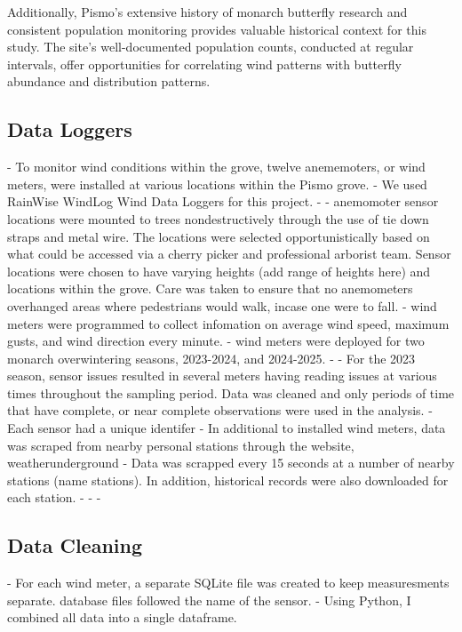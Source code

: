 Additionally, Pismo's extensive history of monarch butterfly research and consistent population monitoring provides valuable historical context for this study. The site's well-documented population counts, conducted at regular intervals, offer opportunities for correlating wind patterns with butterfly abundance and distribution patterns.

\subsection{Data Loggers}

- To monitor wind conditions within the grove, twelve anememoters, or wind meters, were installed at various locations within the Pismo grove.
- We used RainWise WindLog Wind Data Loggers for this project. 
- %
- anemomoter sensor locations were mounted to trees nondestructively through the use of tie down straps and metal wire. The locations were selected opportunistically based on what could be accessed via a cherry picker and professional arborist team. Sensor locations were chosen to have varying heights (add range of heights here) and locations within the grove. Care was taken to ensure that no anemometers overhanged areas where pedestrians would walk, incase one were to fall. 
- wind meters were programmed to collect infomation on average wind speed, maximum gusts, and wind direction every minute. 
- wind meters were deployed for two monarch overwintering seasons, 2023-2024, and 2024-2025. 
- %
- For the 2023 season, sensor issues resulted in several meters having reading issues at various times throughout the sampling period. Data was cleaned and only periods of time that have complete, or near complete observations were used in the analysis. 
- Each sensor had a unique identifer
- In additional to installed wind meters, data was scraped from nearby personal stations through the website, weatherunderground
- Data was scrapped every 15 seconds at a number of nearby stations (name stations). In addition, historical records were also downloaded for each station.
- %
- %
- %


\subsection{Data Cleaning}
- For each wind meter, a separate SQLite file was created to keep measuresments separate. database files followed the name of the sensor. 
- Using Python, I combined all data into a single dataframe.



